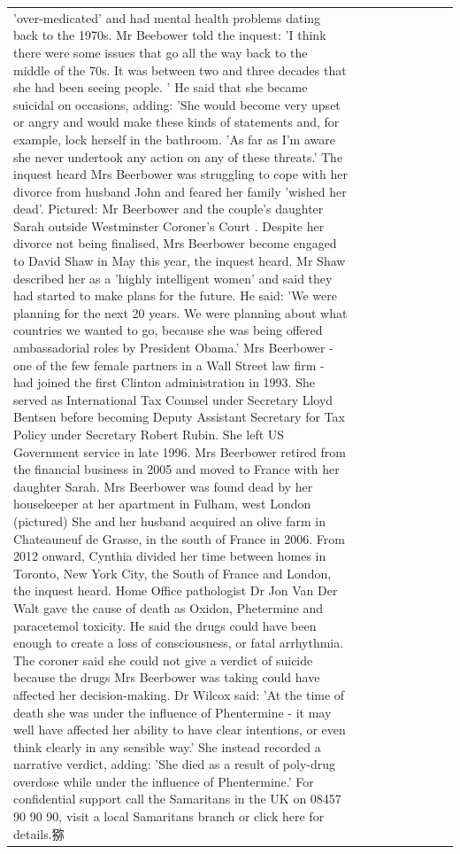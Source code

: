 \begin{table}[H]
\begin{tabular}{lllrlllll}
'over-medicated' and had mental health problems dating back to the 1970s. Mr Beebower told the inquest: 'I think there were some issues that go all the way back to the middle of the 70s. It was between two and three decades that she had been seeing people. ' He said that she became suicidal on occasions, adding: 'She would become very upset or angry and would make these kinds of statements and, for example, lock herself in the bathroom. 'As far as I'm aware she never undertook any action on any of these threats.' The inquest heard Mrs Beerbower was struggling to cope with her divorce from husband John and feared her family 'wished her dead'. Pictured: Mr Beerbower and the couple's daughter Sarah outside Westminster Coroner's Court . Despite her divorce not being finalised, Mrs Beerbower become engaged to David Shaw in May this year, the inquest heard. Mr Shaw described her as a 'highly intelligent women' and said they had started to make plans for the future. He said: 'We were planning for the next 20 years. We were planning about what countries we wanted to go, because she was being offered ambassadorial roles by President Obama.' Mrs Beerbower - one of the few female partners in a Wall Street law firm - had joined the first Clinton administration in 1993. She served as International Tax Counsel under Secretary Lloyd Bentsen before becoming Deputy Assistant Secretary for Tax Policy under Secretary Robert Rubin. She left US Government service in late 1996. Mrs Beerbower retired from the financial business in 2005 and moved to France with her daughter Sarah. Mrs Beerbower was found dead by her housekeeper at her apartment in Fulham, west London (pictured) She and her husband acquired an olive farm in Chateauneuf de Grasse, in the south of France in 2006. From 2012 onward, Cynthia divided her time between homes in Toronto, New York City, the South of France and London, the inquest heard. Home Office pathologist Dr Jon Van Der Walt gave the cause of death as Oxidon, Phetermine and paracetemol toxicity. He said the drugs could have been enough to create a loss of consciousness, or fatal arrhythmia. The coroner said she could not give a verdict of suicide because the drugs Mrs Beerbower was taking could have affected her decision-making. Dr Wilcox said: 'At the time of death she was under the influence of Phentermine - it may well have affected her ability to have clear intentions, or even think clearly in any sensible way.' She instead recorded a narrative verdict, adding: 'She died as a result of poly-drug overdose while under the influence of Phentermine.' For confidential support call the Samaritans in the UK on 08457 90 90 90, visit a local Samaritans branch or click here for details.猕 \\

\end{tabular}
\end{table}

